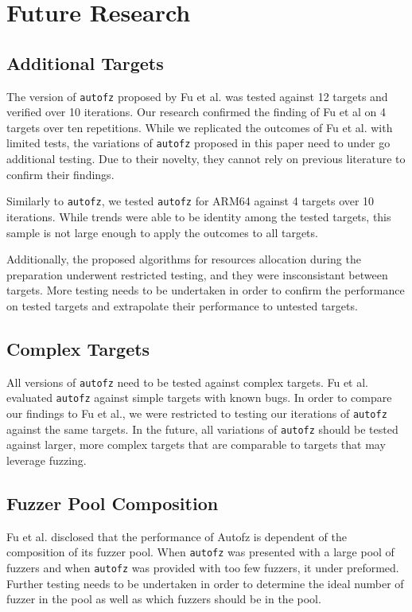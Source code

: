 \section{Future Research}
\subsection{Additional Targets} The version of \texttt{autofz} proposed by Fu et al. 
was tested against 12 targets and verified over 10 iterations. Our research  
confirmed the finding of Fu et al on 4 targets over ten repetitions. While we 
replicated the outcomes of Fu et al. with limited tests, the variations 
of \texttt{autofz} proposed in this paper need to under go additional testing. Due to their 
novelty, they cannot rely on previous literature to confirm their findings.

Similarly to \texttt{autofz}, we tested \texttt{autofz} for ARM64 against 4 targets over 10 
iterations. While trends were able to be identity among the tested targets, this
sample is not large enough to apply the outcomes to all targets. 

Additionally, the proposed algorithms for resources allocation during the preparation
underwent restricted testing, and they were insconsistant between targets. 
More testing needs to be undertaken in order to confirm the performance on tested targets and
extrapolate their performance to untested targets.

\subsection{Complex Targets} All versions of \texttt{autofz} need to be tested against 
complex targets. Fu et al. evaluated \texttt{autofz} against simple targets with known bugs. In 
order to compare our findings to Fu et al., we were restricted to testing our 
iterations of \texttt{autofz} against the same targets. In the future, all variations of 
\texttt{autofz} should be tested against larger, more complex targets that are comparable to
targets that may leverage fuzzing.

\subsection{Fuzzer Pool Composition} Fu et al. disclosed that the performance of
Autofz is dependent of the composition of its fuzzer pool. When \texttt{autofz} was presented
with a large pool of fuzzers and when \texttt{autofz} was provided with too few fuzzers, it 
under preformed. Further testing needs to be undertaken in order to determine the ideal
number of fuzzer in the pool as well as which fuzzers should be in the pool.

